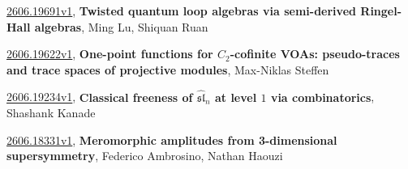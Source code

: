 \documentclass[9pt, a4paper]{article}
\theoremstyle{plain}
\theoremstyle{definition}
\theoremstyle{remark}
\newcommand{\arxiv}[3]{\href{https://arxiv.org/abs/#1}{#1}, \textbf{\textcolor{arxivblue}{#2}}, #3}
\begin{document}
\arxiv{2606.19691v1}{Twisted quantum loop algebras via semi-derived Ringel-Hall algebras}{Ming Lu, Shiquan Ruan}

\arxiv{2606.19622v1}{One-point functions for $C_2$-cofinite VOAs: pseudo-traces and trace spaces of projective modules}{Max-Niklas Steffen}

\arxiv{2606.19234v1}{Classical freeness of $\widehat{\mathfrak{sl}}_n$ at level $1$ via combinatorics}{Shashank Kanade}

\arxiv{2606.18331v1}{Meromorphic amplitudes from 3-dimensional supersymmetry}{Federico Ambrosino, Nathan Haouzi}

\end{document}
